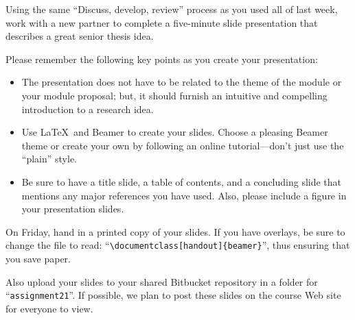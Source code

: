 
\usepackage{ulem}
\usepackage{tikz}
\usepackage[compact]{titlesec}




Using the same ``Discuss, develop, review'' process as you used all of last week, work with a new partner to complete a
five-minute slide presentation that describes a great senior thesis idea.

Please remember the following key points as you create your presentation:
\begin{itemize}

    \item The presentation does not have to be related to the theme of the module or your module proposal; but, it
    should furnish an intuitive and compelling introduction to a research idea.

    \item Use \LaTeX\ and Beamer to create your slides. Choose a pleasing Beamer theme or create your own by following
    an online tutorial---don't just use the ``plain'' style.

    \item Be sure to have a title slide, a table of contents, and a concluding slide that mentions any major references
    you have used. Also, please include a figure in your presentation slides.

\end{itemize}

On Friday, hand in a printed copy of your slides. If you have overlays, be sure to change the file to read:
``\verb$\documentclass[handout]{beamer}$'', thus ensuring that you save paper.


Also upload your slides to your shared Bitbucket repository in a folder for ``{\tt assignment21}''. If possible, we plan
to post these slides on the course Web site for everyone to view.



